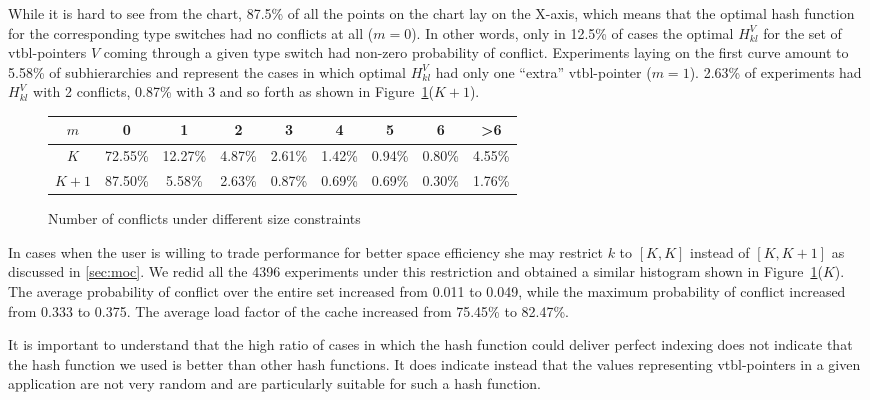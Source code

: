 While it is hard to see from the chart, 87.5\% of all the points on the chart 
lay on the X-axis, which means that the optimal hash function for the 
corresponding type switches had no conflicts at all ($m=0$). In other words, only in 12.5\% 
of cases the optimal $H_{kl}^V$ for the set of vtbl-pointers $V$ coming through 
a given type switch had non-zero probability of conflict. Experiments laying on 
the first curve amount to 5.58\% of subhierarchies and represent the cases in 
which optimal $H_{kl}^V$ had only one ``extra'' vtbl-pointer ($m=1$). 2.63\% of 
experiments had $H_{kl}^V$ with 2 conflicts, 0.87\% with 3 and so forth as shown 
in Figure~\ref{fig:size}($K+1$).

\begin{figure}[htbp]
\small
\begin{tabular}
{@{}c@{}||@{}c@{}|@{}c@{}|@{}c@{}|@{}c@{}|@{}c@{}|@{}c@{}|@{}c@{}|@{}c@{}}
\hline %
  $m$ &       0 &       1 &      2 &      3 &      4 &        5 &      6 & \textgreater 6 \\
\hline %
  $K$ & 72.55\% & 12.27\% & 4.87\% & 2.61\% & 1.42\% & 0.94\% & 0.80\% & 4.55\% \\
\hline %
$K+1$ & 87.50\% &  5.58\% & 2.63\% & 0.87\% & 0.69\% & 0.69\% & 0.30\% & 1.76\% 
\end{tabular}
\caption{Number of conflicts under different size constraints}
\label{fig:size}
\end{figure}

\noindent
In cases when the user is willing to trade performance for better space 
efficiency she may restrict $k$ to $[K,K]$ instead of $[K,K+1]$ as discussed in 
\textsection\ref{sec:moc}. We redid all the 4396 experiments under this 
restriction and obtained a similar histogram shown in Figure~\ref{fig:size}($K$).
The average probability of conflict over the entire set increased from 0.011 to 
0.049, while the maximum probability of conflict increased from 0.333 to 0.375. 
The average load factor of the cache increased from 75.45\% to 82.47\%. 

It is important to understand that the high ratio of cases in which the hash 
function could deliver perfect indexing does not indicate that the hash function 
we used is better than other hash functions. It does indicate instead that the 
values representing vtbl-pointers in a given application are not very random and 
are particularly suitable for such a hash function.


